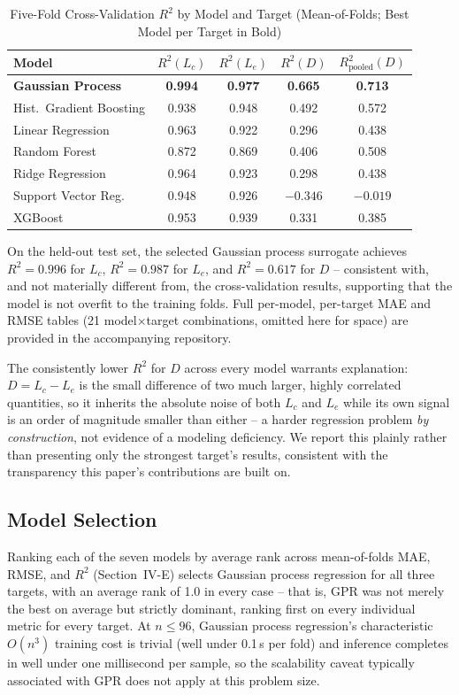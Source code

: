 \documentclass[conference]{IEEEtran}
\begin{document}
\begin{table}[!t]
\caption{Five-Fold Cross-Validation $R^2$ by Model and Target (Mean-of-Folds; Best Model per Target in Bold)}
\label{tab:cvresults}
\centering
\begin{tabular}{@{}lccc c@{}}
\toprule
\textbf{Model} & $R^2(L_c)$ & $R^2(L_e)$ & $R^2(D)$ & $R^2_{\text{pooled}}(D)$ \\
\midrule
\textbf{Gaussian Process} & \textbf{0.994} & \textbf{0.977} & \textbf{0.665} & \textbf{0.713} \\
Hist.\ Gradient Boosting & 0.938 & 0.948 & 0.492 & 0.572 \\
Linear Regression & 0.963 & 0.922 & 0.296 & 0.438 \\
Random Forest & 0.872 & 0.869 & 0.406 & 0.508 \\
Ridge Regression & 0.964 & 0.923 & 0.298 & 0.438 \\
Support Vector Reg. & 0.948 & 0.926 & $-0.346$ & $-0.019$ \\
XGBoost & 0.953 & 0.939 & 0.331 & 0.385 \\
\bottomrule
\end{tabular}
\end{table}

On the held-out test set, the selected Gaussian process surrogate achieves $R^2=0.996$ for $L_c$, $R^2=0.987$ for $L_e$, and $R^2=0.617$ for $D$ -- consistent with, and not materially different from, the cross-validation results, supporting that the model is not overfit to the training folds. Full per-model, per-target MAE and RMSE tables (21 model$\times$target combinations, omitted here for space) are provided in the accompanying repository.

The consistently lower $R^2$ for $D$ across every model warrants explanation: $D=L_c-L_e$ is the small difference of two much larger, highly correlated quantities, so it inherits the absolute noise of both $L_c$ and $L_e$ while its own signal is an order of magnitude smaller than either -- a harder regression problem \emph{by construction}, not evidence of a modeling deficiency. We report this plainly rather than presenting only the strongest target's results, consistent with the transparency this paper's contributions are built on.

\subsection{Model Selection}
Ranking each of the seven models by average rank across mean-of-folds MAE, RMSE, and $R^2$ (Section~IV-E) selects Gaussian process regression for all three targets, with an average rank of 1.0 in every case -- that is, GPR was not merely the best on average but strictly dominant, ranking first on every individual metric for every target. At $n\leq96$, Gaussian process regression's characteristic $O(n^3)$ training cost is trivial (well under 0.1\,s per fold) and inference completes in well under one millisecond per sample, so the scalability caveat typically associated with GPR does not apply at this problem size.
\end{document}
